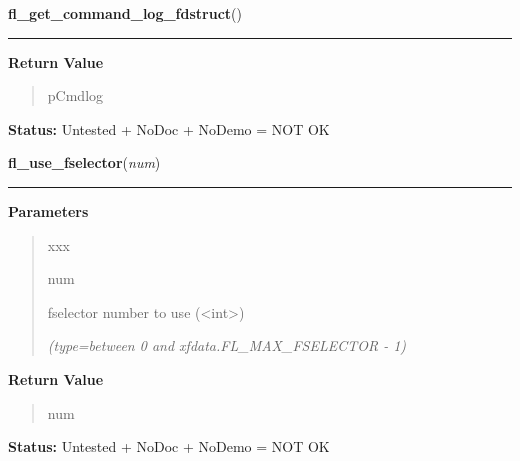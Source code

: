 \hspace{.8\funcindent}\begin{boxedminipage}{\funcwidth}

    \raggedright \textbf{fl\_get\_command\_log\_fdstruct}()

    \vspace{-1.5ex}

    \rule{\textwidth}{0.5\fboxrule}
\setlength{\parskip}{2ex}
\setlength{\parskip}{1ex}
      \textbf{Return Value}
    \vspace{-1ex}

      \begin{quote}
      pCmdlog

      \end{quote}

\textbf{Status:} Untested + NoDoc + NoDemo = NOT OK



    \end{boxedminipage}

    \label{xformslib:library:fl_use_fselector}

    \vspace{0.5ex}

\hspace{.8\funcindent}\begin{boxedminipage}{\funcwidth}

    \raggedright \textbf{fl\_use\_fselector}(\textit{num})

    \vspace{-1.5ex}

    \rule{\textwidth}{0.5\fboxrule}
\setlength{\parskip}{2ex}
\setlength{\parskip}{1ex}
      \textbf{Parameters}
      \vspace{-1ex}

      \begin{quote}
        \begin{Ventry}{xxx}

          \item[num]

          fselector number to use ({\textless}int{\textgreater})

            {\it (type=between 0 and xfdata.FL\_MAX\_FSELECTOR - 1)}

        \end{Ventry}

      \end{quote}

      \textbf{Return Value}
    \vspace{-1ex}

      \begin{quote}
      num

      \end{quote}

\textbf{Status:} Untested + NoDoc + NoDemo = NOT OK



    \end{boxedminipage}

